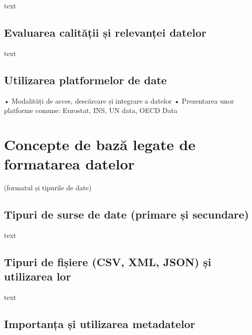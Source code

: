 \documentclass[
  11pt,
  b5paper,
  nottoc]{book}
\begin{document}
text

\hypertarget{evaluarea-calitux103ux21bii-ux219i-relevanux21bei-datelor-4}{%
\subsection{Evaluarea calității și relevanței
datelor}\label{evaluarea-calitux103ux21bii-ux219i-relevanux21bei-datelor-4}}

text

\hypertarget{utilizarea-platformelor-de-date-4}{%
\subsection{Utilizarea platformelor de
date}\label{utilizarea-platformelor-de-date-4}}

• Modalități de acces, descărcare și integrare a datelor • Prezentarea
unor platforme comune: Eurostat, INS, UN data, OECD Data

\hypertarget{concepte-de-bazux103-legate-de-formatarea-datelor-4}{%
\section{Concepte de bază legate de formatarea
datelor}\label{concepte-de-bazux103-legate-de-formatarea-datelor-4}}

(formatul și tipurile de date)

\hypertarget{tipuri-de-surse-de-date-primare-ux219i-secundare-4}{%
\subsection{Tipuri de surse de date (primare și
secundare)}\label{tipuri-de-surse-de-date-primare-ux219i-secundare-4}}

text

\hypertarget{tipuri-de-fiux219iere-csv-xml-json-ux219i-utilizarea-lor-4}{%
\subsection{Tipuri de fișiere (CSV, XML, JSON) și utilizarea
lor}\label{tipuri-de-fiux219iere-csv-xml-json-ux219i-utilizarea-lor-4}}

text

\hypertarget{importanux21ba-ux219i-utilizarea-metadatelor-4}{%
\subsection{Importanța și utilizarea
metadatelor}\label{importanux21ba-ux219i-utilizarea-metadatelor-4}}
\end{document}
